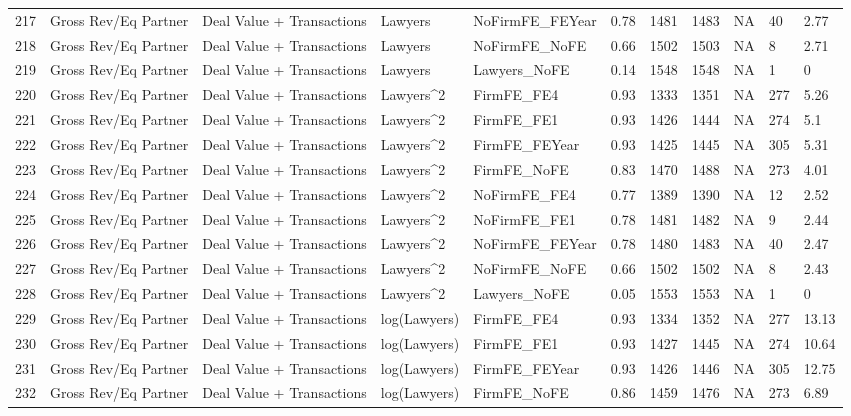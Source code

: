 \documentclass{article}
\begin{document}
\begin{table}[H]
\begin{tabular}{rllllllllll}
  217 & Gross Rev/Eq Partner & Deal Value + Transactions & Lawyers & NoFirmFE\_FEYear & 0.78 & 1481 & 1483 & NA & 40 & 2.77 \\ 
  218 & Gross Rev/Eq Partner & Deal Value + Transactions & Lawyers & NoFirmFE\_NoFE & 0.66 & 1502 & 1503 & NA & 8 & 2.71 \\ 
  219 & Gross Rev/Eq Partner & Deal Value + Transactions & Lawyers & Lawyers\_NoFE & 0.14 & 1548 & 1548 & NA & 1 & 0 \\ 
  220 & Gross Rev/Eq Partner & Deal Value + Transactions & Lawyers^2 & FirmFE\_FE4 & 0.93 & 1333 & 1351 & NA & 277 & 5.26 \\ 
  221 & Gross Rev/Eq Partner & Deal Value + Transactions & Lawyers^2 & FirmFE\_FE1 & 0.93 & 1426 & 1444 & NA & 274 & 5.1 \\ 
  222 & Gross Rev/Eq Partner & Deal Value + Transactions & Lawyers^2 & FirmFE\_FEYear & 0.93 & 1425 & 1445 & NA & 305 & 5.31 \\ 
  223 & Gross Rev/Eq Partner & Deal Value + Transactions & Lawyers^2 & FirmFE\_NoFE & 0.83 & 1470 & 1488 & NA & 273 & 4.01 \\ 
  224 & Gross Rev/Eq Partner & Deal Value + Transactions & Lawyers^2 & NoFirmFE\_FE4 & 0.77 & 1389 & 1390 & NA & 12 & 2.52 \\ 
  225 & Gross Rev/Eq Partner & Deal Value + Transactions & Lawyers^2 & NoFirmFE\_FE1 & 0.78 & 1481 & 1482 & NA & 9 & 2.44 \\ 
  226 & Gross Rev/Eq Partner & Deal Value + Transactions & Lawyers^2 & NoFirmFE\_FEYear & 0.78 & 1480 & 1483 & NA & 40 & 2.47 \\ 
  227 & Gross Rev/Eq Partner & Deal Value + Transactions & Lawyers^2 & NoFirmFE\_NoFE & 0.66 & 1502 & 1502 & NA & 8 & 2.43 \\ 
  228 & Gross Rev/Eq Partner & Deal Value + Transactions & Lawyers^2 & Lawyers\_NoFE & 0.05 & 1553 & 1553 & NA & 1 & 0 \\ 
  229 & Gross Rev/Eq Partner & Deal Value + Transactions & log(Lawyers) & FirmFE\_FE4 & 0.93 & 1334 & 1352 & NA & 277 & 13.13 \\ 
  230 & Gross Rev/Eq Partner & Deal Value + Transactions & log(Lawyers) & FirmFE\_FE1 & 0.93 & 1427 & 1445 & NA & 274 & 10.64 \\ 
  231 & Gross Rev/Eq Partner & Deal Value + Transactions & log(Lawyers) & FirmFE\_FEYear & 0.93 & 1426 & 1446 & NA & 305 & 12.75 \\ 
  232 & Gross Rev/Eq Partner & Deal Value + Transactions & log(Lawyers) & FirmFE\_NoFE & 0.86 & 1459 & 1476 & NA & 273 & 6.89 \\ 

\end{tabular}
\end{table}
\end{document}
